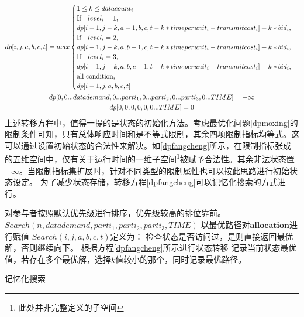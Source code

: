 \documentclass[promaster]{thesis-uestc}
\begin{document}
\begin{gather}
\label{dpfangcheng}  
dp[i,j,a,b,c,t] = max
\begin{cases}
1 \leq k \leq datacount_i \\
\text{If} \quad level_i = 1,\\
dp[i-1,j-k,a-1,b,c,t-k*timeperunit_i-transmitcost_i]+ k*bid_i,\\
\text{If}\quad level_i = 2,\\
dp[i-1,j-k,a,b-1,c,t-k*timeperunit_i-transmitcost_i]+ k*bid_i,\\
\text{If} \quad level_i = 3,\\
dp[i-1,j-k,a,b,c-1,t-k*timeperunit_i-transmitcost_i]+ k*bid_i,\\
\text{all condition},\\
dp[i-1,j,a,b,c,t]
\end{cases}\\
dp[0,0...datademand,0...parti_1,0...parti_2,0...parti_3,0...TIME] =-\infty \notag\\
dp[0,0,0,0,0,0...TIME] = 0 \notag
\end{gather}
上述转移方程中，值得一提的是状态的初始化方法。考虑最优化问题\ref{dpmoxing}的限制条件可知，只有总体响应时间和是不等式限制，其余四项限制指标均等式。这可以通过设置初始状态的合法性来解决。如\ref{dpfangcheng}所示，在限制指标张成的五维空间中，仅有关于运行时间的一维子空间\footnote{此处并非完整定义的子空间}被赋予合法性。其余非法状态置$-\infty$。当限制指标集扩展时，针对不同类型的限制属性也可以按此思路进行初始状态设定。
为了减少状态存储，转移方程\ref{dpfangcheng}可以记忆化搜索的方式进行。
\begin{algorithm}[H]
    对参与者按照默认优先级进行排序，优先级较高的排位靠前。
    $Search(n,datademand,parti_1,parti_2,parti_3,TIME)$\;
    以最优路径对$\mathbf{allocation}$进行赋值\;
    \;
    $Search(i,j,a,b,c,t)$定义为：\;
    检查状态是否访问过，是则直接返回最优解，否则继续向下。\;
    根据方程\ref{dpfangcheng}所示进行状态转移\;
    记录当前状态最优值，若存在多个最优解，选择$k$值较小的那个，同时记录最优路径。\;
\caption{记忆化搜索}
\label{jiyihua}
\end{algorithm}
\end{document}
